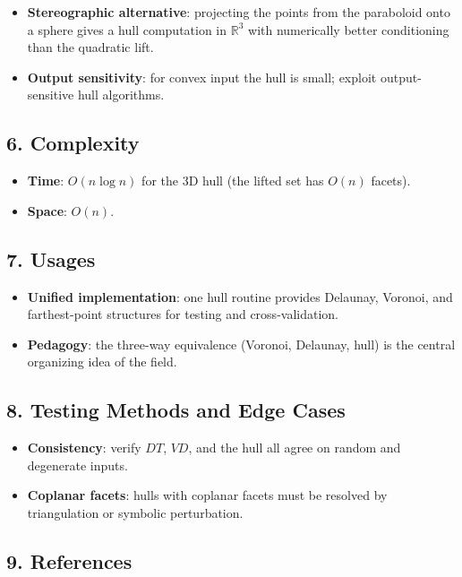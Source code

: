 \begin{itemize}
\item \textbf{Stereographic alternative}: projecting the points from the
  paraboloid onto a sphere gives a hull computation in $\mathbb{R}^3$ with
  numerically better conditioning than the quadratic lift.
\item \textbf{Output sensitivity}: for convex input the hull is small; exploit
  output-sensitive hull algorithms.
\end{itemize}

\subsection{6. Complexity}

\begin{itemize}
\item \textbf{Time}: $O(n \log n)$ for the 3D hull (the lifted set has $O(n)$
  facets).
\item \textbf{Space}: $O(n)$.
\end{itemize}

\subsection{7. Usages}

\begin{itemize}
\item \textbf{Unified implementation}: one hull routine provides Delaunay,
  Voronoi, and farthest-point structures for testing and cross-validation.
\item \textbf{Pedagogy}: the three-way equivalence (Voronoi, Delaunay, hull) is
  the central organizing idea of the field.
\end{itemize}

\subsection{8. Testing Methods and Edge Cases}

\begin{itemize}
\item \textbf{Consistency}: verify $DT$, $VD$, and the hull all agree on random
  and degenerate inputs.
\item \textbf{Coplanar facets}: hulls with coplanar facets must be resolved by
  triangulation or symbolic perturbation.
\end{itemize}

\subsection{9. References}

